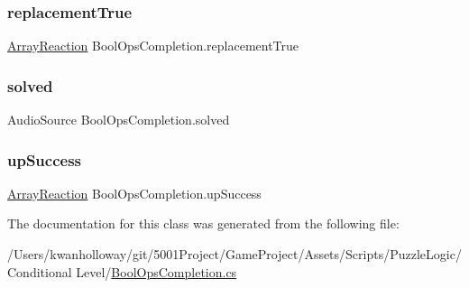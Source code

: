 \mbox{\label{class_bool_ops_completion_a1e2dab96d55c7681be9d553f96fa652f}} 
\subsubsection{\texorpdfstring{replacement\+True}{replacementTrue}}
{\footnotesize\ttfamily \hyperlink{class_array_reaction}{Array\+Reaction} Bool\+Ops\+Completion.\+replacement\+True}

\mbox{\label{class_bool_ops_completion_a1d343ac77c80d677ef0872217fcd5dc6}} 
\subsubsection{\texorpdfstring{solved}{solved}}
{\footnotesize\ttfamily Audio\+Source Bool\+Ops\+Completion.\+solved}

\mbox{\label{class_bool_ops_completion_a125b0cee3df92d1129222378c68776de}} 
\subsubsection{\texorpdfstring{up\+Success}{upSuccess}}
{\footnotesize\ttfamily \hyperlink{class_array_reaction}{Array\+Reaction} Bool\+Ops\+Completion.\+up\+Success}



The documentation for this class was generated from the following file\+:\begin{DoxyCompactItemize}
\item 
/\+Users/kwanholloway/git/5001\+Project/\+Game\+Project/\+Assets/\+Scripts/\+Puzzle\+Logic/\+Conditional Level/\hyperlink{_bool_ops_completion_8cs}{Bool\+Ops\+Completion.\+cs}\end{DoxyCompactItemize}
